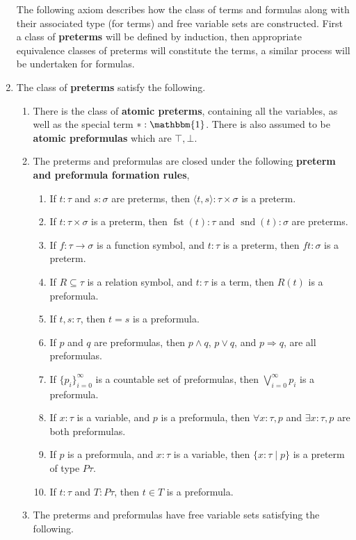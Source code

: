 \documentclass{tac}
\begin{document}
\begin{definition}
\begin{enumerate}
			The following axiom describes how the class of terms and formulas along with their associated type (for terms) and free variable sets are constructed. First a class of \textbf{preterms} will be defined by induction, then appropriate equivalence classes of preterms will constitute the terms, a similar process will be undertaken for formulas.
			\item The class of \textbf{preterms} satisfy the following.
			\begin{enumerate}
				\item There is the class of \textbf{atomic preterms}, containing all the variables, as well as the special term $\ast : \mathbbm{1}$. There is also assumed to be \textbf{atomic preformulas} which are $\top, \bot$.
				\item The preterms and preformulas are closed under the following \textbf{preterm and preformula formation rules},
				\begin{enumerate}
					\item If $t:\tau$ and $s:\sigma$ are preterms, then $\langle t,s\rangle : \tau \times \sigma$ is a preterm.
					\item If $t: \tau \times \sigma$ is a preterm, then $\operatorname{fst}(t) : \tau$ and $\operatorname{snd}(t) : \sigma$ are preterms.
					\item If $f:\tau \to \sigma$ is a function symbol, and $t:\tau$ is a preterm, then $ft:\sigma$ is a preterm.
					\item If $R \subseteq \tau$ is a relation symbol, and $t:\tau$ is a term, then $R(t)$ is a preformula.
					\item If $t,s:\tau$, then $t = s$ is a preformula.
					\item If $p$ and $q$ are preformulas, then $p \wedge q$, $p \vee q$, and $p \Rightarrow q$, are all preformulas.
					\item If $\lbrace p_i\rbrace_{i = 0}^\infty$ is a countable set of preformulas, then $\bigvee_{i = 0}^\infty p_i$ is a preformula.
					\item If $x : \tau$ is a variable, and $p$ is a preformula, then $\forall x : \tau, p$ and $\exists x : \tau, p$ are both preformulas.
					\item If $p$ is a preformula, and $x : \tau$ is a variable, then $\lbrace x : \tau \mid p\rbrace$ is a preterm of type $P\tau$.
					\item If $t : \tau$ and $T : P\tau$, then $t \in T$ is a preformula.
				\end{enumerate}
				\item The preterms and preformulas have free variable sets satisfying the following.

\end{enumerate}
\end{enumerate}
\end{definition}
\end{document}
